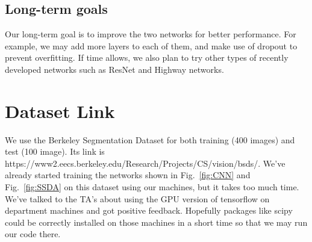 \documentclass[11pt]{article}
\begin{document}
\subsection{Long-term goals}
Our long-term goal is to improve the two networks for better performance.
For example, we may add more layers to each of them, and make use of dropout to prevent overfitting.
If time allows, we also plan to try other types of recently developed networks such as ResNet and Highway networks.

\section{Dataset Link}
We use the Berkeley Segmentation Dataset for both training (400 images) and test (100 image). 
Its link is https://www2.eecs.berkeley.edu/Research/Projects/CS/vision/bsds/.
We've already started training the networks shown in Fig.~\ref{fig:CNN} and Fig.~\ref{fig:SSDA} on this dataset using our machines, but it takes too much time.
We've talked to the TA's about using the GPU version of tensorflow on department machines and got positive feedback. 
Hopefully packages like scipy could be correctly installed on those machines in a short time so that we may run our code there.

{\small
\linespread{1}

}
\end{document}
